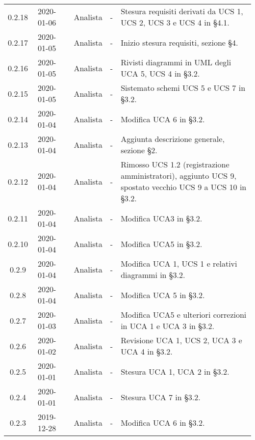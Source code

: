 {\begin{longtable}{ c c  C{2.5cm} c C{3cm} C{3.5cm}}
0.2.18 & 2020-01-06 & \CE{} & Analista & - & Stesura requisiti derivati da UCS 1, UCS 2, UCS 3 e UCS 4 in §4.1. \\

0.2.17 & 2020-01-05 & \CE{} & Analista & - & Inizio stesura requisiti, sezione §4. \\

0.2.16 & 2020-01-05 & \DF{} & Analista & - & Rivisti diagrammi in UML degli UCA 5, UCS 4 in §3.2. \\

0.2.15 & 2020-01-05 & \PF{} & Analista & - & Sistemato schemi UCS 5 e UCS 7 in §3.2. \\

0.2.14 & 2020-01-04 & \PF{} & Analista & - & Modifica UCA 6 in §3.2. \\

0.2.13 & 2020-01-04 & \CE{} & Analista & - & Aggiunta descrizione generale, sezione §2. \\

0.2.12 & 2020-01-04 & \CE{} & Analista & - & Rimosso UCS 1.2 (registrazione amministratori), aggiunto UCS 9, spostato vecchio UCS 9 a UCS 10 in §3.2. \\

0.2.11 & 2020-01-04 & \PF{} & Analista & - & Modifica UCA3 in §3.2. \\

0.2.10 & 2020-01-04 & \DF{} & Analista & - & Modifica UCA5 in §3.2. \\

0.2.9 & 2020-01-04 & \DF{} & Analista & - & Modifica UCA 1, UCS 1 e relativi diagrammi in §3.2. \\

0.2.8 & 2020-01-04 & \CE{} & Analista & - & Modifica UCA 5 in §3.2. \\

0.2.7 & 2020-01-03 & \CE{} & Analista & - & Modifica UCA5 e ulteriori correzioni in UCA 1 e UCA 3 in §3.2. \\

0.2.6 & 2020-01-02 & \CE{} & Analista & - & Revisione UCA 1, UCS 2, UCA 3 e UCA 4 in §3.2. \\

0.2.5 & 2020-01-01 & \BR{} & Analista & - & Stesura UCA 1, UCA 2 in §3.2. \\

0.2.4 & 2020-01-01 & \PF{} & Analista & - & Stesura UCA 7 in §3.2. \\

0.2.3 & 2019-12-28 & \DF{} & Analista & - & Modifica UCA 6 in §3.2. \\


\end{longtable}}

